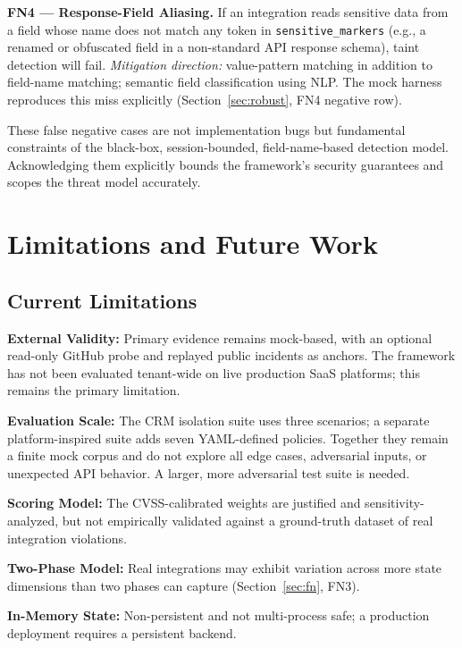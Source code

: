 \documentclass[conference]{IEEEtran}
\begin{document}
\textbf{FN4 --- Response-Field Aliasing.} If an integration reads
sensitive data from a field whose name does not match any token in
\texttt{sensitive\_markers} (e.g., a renamed or obfuscated field in
a non-standard API response schema), taint detection will fail.
\emph{Mitigation direction:} value-pattern matching in addition to
field-name matching; semantic field classification using NLP.
The mock harness reproduces this miss explicitly (Section~\ref{sec:robust},
FN4 negative row).

These false negative cases are not implementation bugs but fundamental
constraints of the black-box, session-bounded, field-name-based
detection model. Acknowledging them explicitly bounds the framework's
security guarantees and scopes the threat model accurately.

\section{Limitations and Future Work}
\label{sec:limit}

\subsection{Current Limitations}

\textbf{External Validity:} Primary evidence remains mock-based, with an
optional read-only GitHub probe and replayed public incidents as anchors.
The framework has not been evaluated tenant-wide on live production
SaaS platforms; this remains the primary limitation.

\textbf{Evaluation Scale:} The CRM isolation suite uses three
scenarios; a separate platform-inspired suite adds seven YAML-defined
policies. Together they remain a finite mock corpus and do not explore
all edge cases, adversarial inputs, or unexpected API behavior. A
larger, more adversarial test suite is needed.

\textbf{Scoring Model:} The CVSS-calibrated weights are justified and
sensitivity-analyzed, but not empirically validated against a
ground-truth dataset of real integration violations.

\textbf{Two-Phase Model:} Real integrations may exhibit variation
across more state dimensions than two phases can capture
(Section~\ref{sec:fn}, FN3).

\textbf{In-Memory State:} Non-persistent and not multi-process safe;
a production deployment requires a persistent backend.
\end{document}
